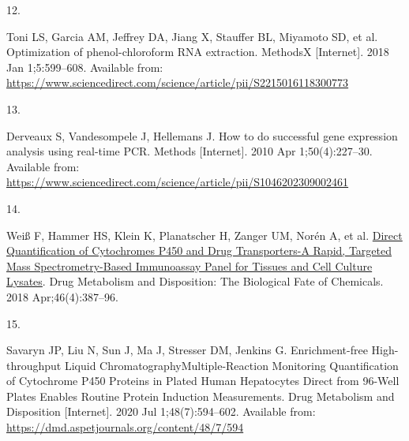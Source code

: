 \documentclass[
  letterpaper,
  DIV=11,
  numbers=noendperiod,
  oneside]{scrartcl}
\newlength{\cslhangindent}
\newlength{\csllabelwidth}
\newenvironment{CSLReferences}[2] %
 {\begin{list}{}{%
  \setlength{\itemindent}{0pt}
  \setlength{\leftmargin}{0pt}
  \setlength{\parsep}{0pt}
  \ifodd #1
   \setlength{\leftmargin}{\cslhangindent}
   \setlength{\itemindent}{-1\cslhangindent}
  \fi
  \setlength{\itemsep}{#2\baselineskip}}}
 {\end{list}}
\newcommand{\CSLLeftMargin}[1]{\parbox[t]{\csllabelwidth}{\strut#1\strut}}
\newcommand{\CSLRightInline}[1]{\parbox[t]{\linewidth - \csllabelwidth}{\strut#1\strut}}
\begin{document}
\begin{CSLReferences}{0}{1}
\CSLLeftMargin{12. }%
\CSLRightInline{Toni LS, Garcia AM, Jeffrey DA, Jiang X, Stauffer BL,
Miyamoto SD, et al. Optimization of phenol-chloroform RNA extraction.
MethodsX {[}Internet{]}. 2018 Jan 1;5:599--608. Available from:
\url{https://www.sciencedirect.com/science/article/pii/S2215016118300773}}

\CSLLeftMargin{13. }%
\CSLRightInline{Derveaux S, Vandesompele J, Hellemans J. How to do
successful gene expression analysis using real-time PCR. Methods
{[}Internet{]}. 2010 Apr 1;50(4):227--30. Available from:
\url{https://www.sciencedirect.com/science/article/pii/S1046202309002461}}

\CSLLeftMargin{14. }%
\CSLRightInline{Weiß F, Hammer HS, Klein K, Planatscher H, Zanger UM,
Norén A, et al. \href{https://doi.org/10.1124/dmd.117.078626}{Direct
Quantification of Cytochromes P450 and Drug Transporters-A Rapid,
Targeted Mass Spectrometry-Based Immunoassay Panel for Tissues and Cell
Culture Lysates}. Drug Metabolism and Disposition: The Biological Fate
of Chemicals. 2018 Apr;46(4):387--96. }

\CSLLeftMargin{15. }%
\CSLRightInline{Savaryn JP, Liu N, Sun J, Ma J, Stresser DM, Jenkins G.
Enrichment-free High-throughput Liquid
Chromatography{\textendash}Multiple-Reaction Monitoring Quantification
of Cytochrome P450 Proteins in Plated Human Hepatocytes Direct from
96-Well Plates Enables Routine Protein Induction Measurements. Drug
Metabolism and Disposition {[}Internet{]}. 2020 Jul 1;48(7):594--602.
Available from: \url{https://dmd.aspetjournals.org/content/48/7/594}}

\end{CSLReferences}
\end{document}
